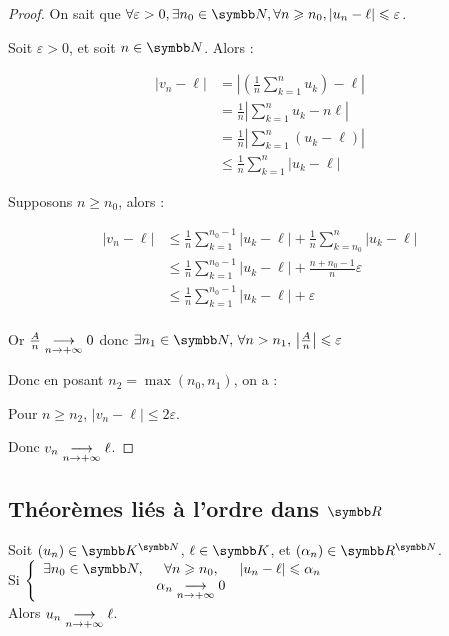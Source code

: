 \begin{proof}
    On sait que $\forall \varepsilon > 0, \exists n_0 \in \N, \forall n \geqslant n_0, |u_n - \ell| \leqslant \varepsilon$.

    Soit $\varepsilon > 0$, et soit $n \in \N$. Alors : 

    \begin{align*}
        |v_n - \ell| &= \left| \left(\frac{1}{n} \sum_{k=1}^n u_k\right) - \ell \right| \\
        &= \frac{1}{n} \left| \sum_{k=1}^n u_k - n \ell \right| \\
        &= \frac{1}{n} \left| \sum_{k=1}^n (u_k - \ell) \right| \\
        &\leqslant \frac{1}{n} \sum_{k=1}^n |u_k - \ell|
    \end{align*}
    

    Supposons $n \geqslant n_0$, alors :

    \begin{align*}
        |v_n - \ell| & \leqslant  \frac 1 n \sum_{k=1}^{n_0 - 1} |u_k - \ell| + \frac 1 n \sum_{k=n_0}^n |u_k - \ell| \\
        & \leqslant  \frac 1 n \sum_{k=1}^{n_0 - 1} |u_k - \ell| + \frac {n + n_0 - 1} n \varepsilon \\
        & \leqslant  \frac 1 n \sum_{k=1}^{n_0 - 1} |u_k - \ell| + \varepsilon \\
    \end{align*}

    Or $\frac A n \underset{n \to +\infty}{\longrightarrow} 0$ donc $\exists n_1 \in \N, \, \forall n > n_1, \, \left| \frac A n \right| \leqslant \varepsilon $

    Donc en posant $n_2 = \max(n_0, n_1)$, on a : 

    Pour $n \geqslant n_2$, $|v_n - \ell| \leqslant 2\varepsilon$. 

    Donc $v_n \underset{n \to +\infty}{\longrightarrow} \ell$.
\end{proof}

\subsection{Théorèmes liés à l'ordre dans \texorpdfstring{$\R$}{R}}

\begin{theoreme}{}{}
    Soit $(u_n) \in \K^{\N}$, $\ell \in \K$, et $(\alpha_n) \in \R^{\N}$. \\
    
    Si $\left\{ \begin{array}{lcl}
        \exists n_0 \in \N, & \forall n \geqslant n_0, & |u_n - \ell|\leqslant \alpha_n \\
        \space & \alpha_n \limit{n}{+\infty} 0 & \space \\
    \end{array} \right.
    $ \\

    Alors $u_n \underset{n \to +\infty}{\longrightarrow} \ell$.
\end{theoreme}

